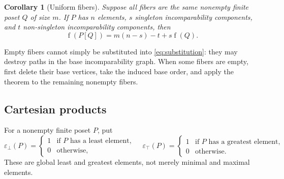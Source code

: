 \documentclass[11pt,letterpaper]{article}
\newtheorem{corollary}[corollary]{Corollary}
\theoremstyle{definition}
\theoremstyle{remark}
\newcommand{\fot}{\operatorname{f}}
\newcommand{\epsbot}{\varepsilon_{\bot}}
\newcommand{\epstop}{\varepsilon_{\top}}
\begin{document}
\begin{corollary}[Uniform fibers]\label{cor:uniform}
Suppose all fibers are the same nonempty finite poset $Q$ of size $m$.
If $P$ has $n$ elements, $s$ singleton incomparability components, and $t$
non-singleton incomparability components, then
\[
 \fot(P[Q])=m(n-s)-t+s\fot(Q).
\]
\end{corollary}

Empty fibers cannot simply be substituted into \eqref{eq:substitution}:
they may destroy paths in the base incomparability graph. When some fibers
are empty, first delete their base vertices, take the induced base order,
and apply the theorem to the remaining nonempty fibers.

\subsection{Cartesian products}
For a nonempty finite poset $P$, put
\[
 \epsbot(P)=
 \begin{cases}1&\text{if $P$ has a least element},\\0&\text{otherwise},\end{cases}
 \quad
 \epstop(P)=
 \begin{cases}1&\text{if $P$ has a greatest element},\\0&\text{otherwise}.\end{cases}
\]
These are global least and greatest elements, not merely minimal and
maximal elements.
\end{document}
